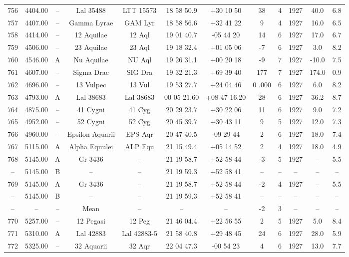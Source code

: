 \begin{table}
\begin{tabular}{cccccccccccc}
756 & 4404.00 & -- & Lal 35488 & LTT 15573 & 18 58 50.9 & +30 10 50 & 38 & 4 & 1927 & 40.0 & 6.8 \\
757 & 4407.00 & -- & Gamma Lyrae & GAM Lyr & 18 58 56.6 & +32 41 22 & 9 & 4 & 1927 & 16.0 & 6.5 \\
758 & 4414.00 & -- & 12 Aquilae & 12 Aql & 19 01 40.7 & -05 44 20 & 14 & 6 & 1927 & 17.0 & 6.7 \\
759 & 4506.00 & -- & 23 Aquilae & 23 Aql & 19 18 32.4 & +01 05 06 & -7 & 6 & 1927 & 3.0 & 8.2 \\
760 & 4546.00 & A & Nu Aquilae & NU Aql & 19 26 31.1 & +00 20 18 & -9 & 7 & 1927 & -10.0 & 7.5 \\
761 & 4607.00 & -- & Sigma Drac & SIG Dra & 19 32 21.3 & +69 39 40 & 177 & 7 & 1927 & 174.0 & 0.9 \\
762 & 4696.00 & -- & 13 Vulpec & 13 Vul & 19 53 27.7 & +24 04 46 & 0 .000 & 6 & 1927 & 6.0 & 8.2 \\
763 & 4793.00 & A & Lal 38683 & Lal 38683 & 00 05 21.60 & +08 47 16.20 & 28 & 6 & 1927 & 36.2 & 8.7 \\
764 & 4875.00 & -- & 41 Cygni & 41 Cyg & 20 29 23.7 & +30 22 06 & 11 & 6 & 1927 & 9.0 & 7.2 \\
765 & 4952.00 & -- & 52 Cygni & 52 Cyg & 20 45 39.7 & +30 43 11 & 9 & 5 & 1927 & 12.0 & 7.3 \\
766 & 4960.00 & -- & Epsilon Aquarii & EPS Aqr & 20 47 40.5 & -09 29 44 & 2 & 6 & 1927 & 18.0 & 7.4 \\
767 & 5115.00 & A & Alpha Equulei & ALP Equ & 21 15 49.4 & +05 14 52 & 2 & 4 & 1927 & 18.0 & 4.9 \\
768 & 5145.00 & A & Gr 3436 & -- & 21 19 58.7 & +52 58 44 & -3 & 5 & 1927 & -- & 5.5 \\
-- & 5145.00 & B & -- & -- & 21 19 59.3 & +52 58 41 & -- & -- & -- & -- & -- \\
769 & 5145.00 & A & Gr 3436 & -- & 21 19 58.7 & +52 58 44 & -2 & 4 & 1927 & -- & 5.5 \\
-- & 5145.00 & B & -- & -- & 21 19 59.3 & +52 58 41 & -- & -- & -- & -- & -- \\
-- & -- & -- & Mean & -- & -- & -- & -2 & 3 & -- & -- & -- \\
770 & 5257.00 & -- & 12 Pegasi & 12 Peg & 21 46 04.4 & +22 56 55 & 2 & 5 & 1927 & 5.0 & 8.4 \\
771 & 5310.00 & A & Lal 42883 & Lal 42883-5 & 21 58 40.8 & +29 48 45 & 24 & 6 & 1927 & 28.0 & 5.9 \\
772 & 5325.00 & -- & 32 Aquarii & 32 Aqr & 22 04 47.3 & -00 54 23 & 4 & 6 & 1927 & 13.0 & 7.7 \\

\end{tabular}
\end{table}
